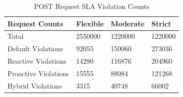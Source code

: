 \begin{table}
    \caption{POST Request SLA Violation Counts}\label{tab:exp2-sla-violation-count}
    \centering
    \begin{tabular}{|l|l|l|l|}
        \hline
        Request Counts & Flexible & Moderate & Strict \\
        \hline
        Total  & \num[group-separator={,}]{2550000} & \num[group-separator={,}]{1220000} & \num[group-separator={,}]{1220000} \\
        Default Violations & \num[group-separator={,}]{92055} & \num[group-separator={,}]{150060} & \num[group-separator={,}]{273036} \\
        Reactive Violations & \num[group-separator={,}]{14280} & \num[group-separator={,}]{116876} & \num[group-separator={,}]{204960} \\
        Proactive Violations & \num[group-separator={,}]{15555} & \num[group-separator={,}]{88084} & \num[group-separator={,}]{121268} \\
        Hybrid Violations & \num[group-separator={,}]{3315} & \num[group-separator={,}]{40748} & \num[group-separator={,}]{66002} \\
         \hline
    \end{tabular}
\end{table}
